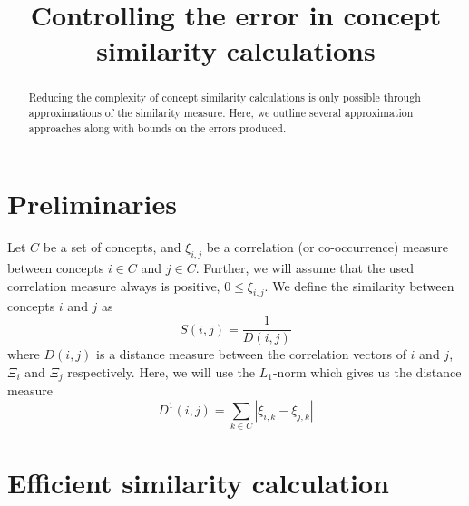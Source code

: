 \documentclass[conference]{IEEEtran}
\begin{document}
\title{Controlling the error in concept similarity calculations}
\author{
  }
\maketitle
\begin{abstract}
  \boldmath Reducing the complexity of concept similarity calculations is only possible through approximations of the similarity measure. Here, we outline several approximation approaches along with bounds on the errors produced.
\end{abstract}


\section{Preliminaries}

Let $C$ be a set of concepts, and $\xi_{i,j}$ be a correlation (or co-occurrence) measure between concepts $i \in C$ and $j \in C$. Further, we will assume that the used correlation measure always is positive, $0 \leq \xi_{i,j}$. We define the similarity between concepts $i$ and $j$ as
\begin{equation}
S(i, j) = \frac{1}{D(i, j)}
\end{equation}
where $D(i, j)$ is a distance measure between the correlation vectors of $i$ and $j$, $\Xi_i$ and $\Xi_j$ respectively. Here, we will use the $L_1$-norm which gives us the distance measure
\begin{equation}
\label{eq:l1div}
D^1(i, j) = \sum_{k \in C} | \xi_{i,k} - \xi_{j,k} |
\end{equation}

\section{Efficient similarity calculation}
\end{document}
